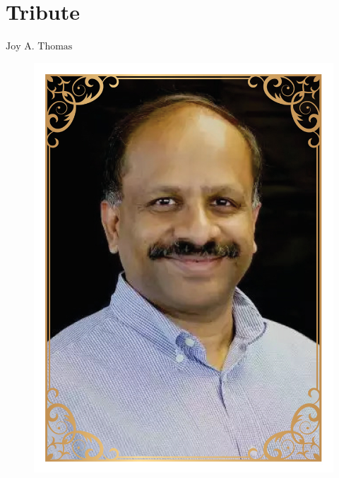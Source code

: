 \chapter{Tribute}




\vskip 0.8cm

\begin{center}
{\large\uppercase{$\text{Joy A. Thomas}$}} 


\vskip -6pt

\end{center}

\vskip 2cm




\vfill




\newpage


\begin{figure}[H]
\centering
\includegraphics[scale=.12]{src/Figures/fig001.jpg}
\end{figure}


